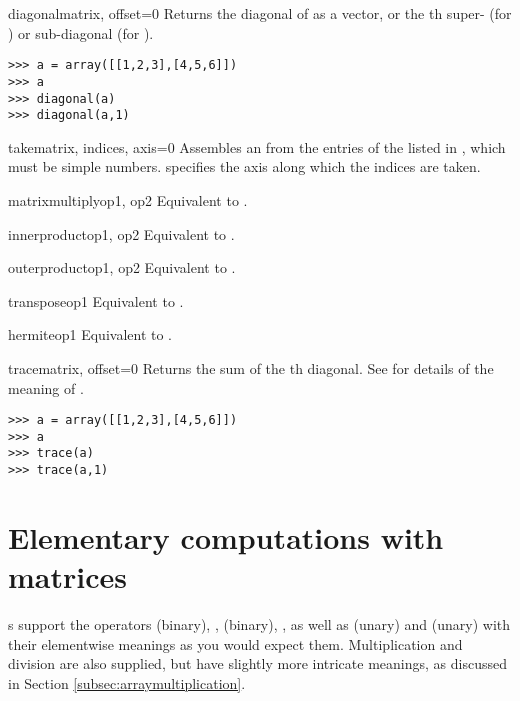 \begin{funcdesc}{diagonal}{matrix, offset=0}
  Returns the diagonal of  as a vector, or the th
  super- (for ) or sub-diagonal (for ).
\begin{verbatim}
>>> a = array([[1,2,3],[4,5,6]])
>>> a
>>> diagonal(a)
>>> diagonal(a,1)
\end{verbatim}
\end{funcdesc}
\begin{funcdesc}{take}{matrix, indices, axis=0}
  Assembles an  from the entries of the 
  listed in , which must be simple numbers. 
  specifies the axis along which the indices are taken.
\end{funcdesc}
\begin{funcdesc}{matrixmultiply}{op1, op2}
  Equivalent to .
\end{funcdesc}
\begin{funcdesc}{innerproduct}{op1, op2}
  Equivalent to .
\end{funcdesc}
\begin{funcdesc}{outerproduct}{op1, op2}
  Equivalent to .
\end{funcdesc}
\begin{funcdesc}{transpose}{op1}
  Equivalent to .
\end{funcdesc}
\begin{funcdesc}{hermite}{op1}
  Equivalent to .
\end{funcdesc}
\begin{funcdesc}{trace}{matrix, offset=0}
  Returns the sum of the th diagonal. See 
  for details of the meaning of .
\begin{verbatim}
>>> a = array([[1,2,3],[4,5,6]])
>>> a
>>> trace(a)
>>> trace(a,1)
\end{verbatim}
\end{funcdesc}
\section{Elementary computations with matrices}
s support the operators \code{+} (binary), \code{+=},
\code{-} (binary), \code{-=}, as well as \code{+} (unary) and \code{-}
(unary) with their elementwise meanings as you would expect them.
Multiplication and division are also supplied, but have slightly more
intricate meanings, as discussed in Section
\ref{subsec:arraymultiplication}.


